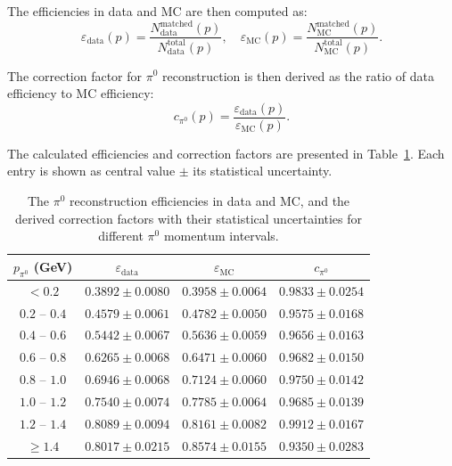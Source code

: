 The efficiencies in data and MC are then computed as:
\begin{equation}
    \varepsilon_{\text{data}}(p) = \frac{N_{\text{data}}^{\text{matched}}(p)}{N_{\text{data}}^{\text{total}}(p)}, \quad
    \varepsilon_{\text{MC}}(p) = \frac{N_{\text{MC}}^{\text{matched}}(p)}{N_{\text{MC}}^{\text{total}}(p)}.
    \label{eq:pi0_efficiency}
\end{equation}

The correction factor for $\pi^0$ reconstruction is then derived as the ratio of data efficiency to MC efficiency:
\begin{equation}
    c_{\pi^0}(p) = \frac{\varepsilon_{\text{data}}(p)}{\varepsilon_{\text{MC}}(p)}.
    \label{eq:pi0_correction}
\end{equation}

The calculated efficiencies and correction factors are presented in Table~\ref{tab:pi0_correction}. Each entry is shown as central value $\pm$ its statistical uncertainty.

\begin{table}[htbp]
    \begin{center}
        \caption{The $\pi^0$ reconstruction efficiencies in data and MC, and the derived correction factors with their statistical uncertainties for different $\pi^0$ momentum intervals.}
        \vspace{4mm}
        \renewcommand{\arraystretch}{1.3}
        \begin{tabular}{c | c | c | c}
            \hline \hline
            $p_{\pi^0}$ (GeV) & $\varepsilon_{\text{data}}$ & $\varepsilon_{\text{MC}}$ & $c_{\pi^0}$         \\
            \hline
            $< 0.2$           & $0.3892 \pm 0.0080$         & $0.3958 \pm 0.0064$       & $0.9833 \pm 0.0254$ \\
            \hline
            $0.2$ -- $0.4$    & $0.4579 \pm 0.0061$         & $0.4782 \pm 0.0050$       & $0.9575 \pm 0.0168$ \\
            \hline
            $0.4$ -- $0.6$    & $0.5442 \pm 0.0067$         & $0.5636 \pm 0.0059$       & $0.9656 \pm 0.0163$ \\
            \hline
            $0.6$ -- $0.8$    & $0.6265 \pm 0.0068$         & $0.6471 \pm 0.0060$       & $0.9682 \pm 0.0150$ \\
            \hline
            $0.8$ -- $1.0$    & $0.6946 \pm 0.0068$         & $0.7124 \pm 0.0060$       & $0.9750 \pm 0.0142$ \\
            \hline
            $1.0$ -- $1.2$    & $0.7540 \pm 0.0074$         & $0.7785 \pm 0.0064$       & $0.9685 \pm 0.0139$ \\
            \hline
            $1.2$ -- $1.4$    & $0.8089 \pm 0.0094$         & $0.8161 \pm 0.0082$       & $0.9912 \pm 0.0167$ \\
            \hline
            $\ge 1.4$         & $0.8017 \pm 0.0215$         & $0.8574 \pm 0.0155$       & $0.9350 \pm 0.0283$ \\
            \hline \hline
        \end{tabular}
        \label{tab:pi0_correction}
    \end{center}
\end{table}

